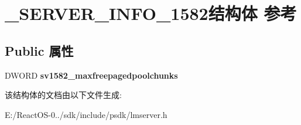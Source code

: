 \hypertarget{struct___s_e_r_v_e_r___i_n_f_o__1582}{}\section{\+\_\+\+S\+E\+R\+V\+E\+R\+\_\+\+I\+N\+F\+O\+\_\+1582结构体 参考}
\label{struct___s_e_r_v_e_r___i_n_f_o__1582}
\subsection*{Public 属性}
\begin{DoxyCompactItemize}
\item 
\mbox{\label{struct___s_e_r_v_e_r___i_n_f_o__1582_ad4f7fe9491716203e327b803639eff4b}} 
D\+W\+O\+RD {\bfseries sv1582\+\_\+maxfreepagedpoolchunks}
\end{DoxyCompactItemize}


该结构体的文档由以下文件生成\+:\begin{DoxyCompactItemize}
\item 
E\+:/\+React\+O\+S-\/0../sdk/include/psdk/lmserver.\+h\end{DoxyCompactItemize}
